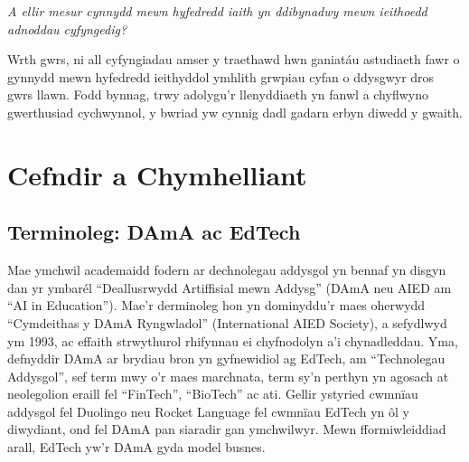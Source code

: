\textit{A ellir mesur cynnydd mewn hyfedredd iaith yn ddibynadwy mewn ieithoedd adnoddau cyfyngedig?}

Wrth gwrs, ni all cyfyngiadau amser y traethawd hwn ganiatáu astudiaeth fawr o gynnydd mewn hyfedredd ieithyddol ymhlith grwpiau cyfan o ddysgwyr dros gwrs llawn. Fodd bynnag, trwy adolygu’r llenyddiaeth yn fanwl a chyflwyno gwerthusiad cychwynnol, y bwriad yw cynnig dadl gadarn erbyn diwedd y gwaith.

\section{Cefndir a Chymhelliant}
\subsection{Terminoleg: DAmA ac EdTech}
Mae ymchwil academaidd fodern ar dechnolegau addysgol yn bennaf yn disgyn dan yr ymbarél ``Deallusrwydd Artiffisial mewn Addysg'' (DAmA neu AIED am ``AI in Education''). Mae'r derminoleg hon yn dominyddu'r maes oherwydd ``Cymdeithas y DAmA Ryngwladol'' (International AIED Society), a sefydlwyd ym 1993, ac effaith strwythurol rhifynnau ei chyfnodolyn a'i chynadleddau. Yma, defnyddir DAmA ar brydiau bron yn gyfnewidiol ag EdTech, am ``Technolegau Addysgol'', sef term mwy o'r maes marchnata, term sy’n perthyn yn agosach at neolegolion eraill fel ``FinTech'', ``BioTech'' ac ati. Gellir ystyried cwmnïau addysgol fel Duolingo neu Rocket Language fel cwmnïau EdTech yn ôl y diwydiant, ond fel DAmA pan siaradir gan ymchwilwyr. Mewn fformiwleiddiad arall, EdTech yw'r DAmA gyda model busnes.

